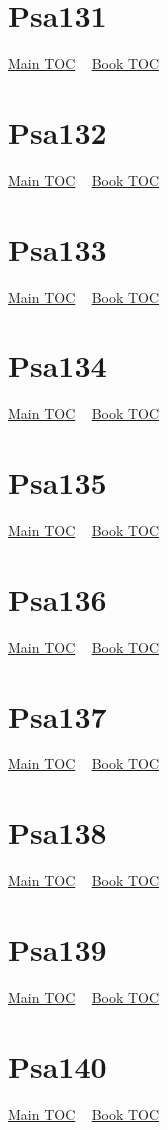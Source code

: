 \documentclass{book}
\begin{document}
  \section{Psa131}\hyperlink{toc}{Main TOC} ~ \hyperref[subsec:Psa]{Book TOC} 
  \section{Psa132}\hyperlink{toc}{Main TOC} ~ \hyperref[subsec:Psa]{Book TOC} 
  \section{Psa133}\hyperlink{toc}{Main TOC} ~ \hyperref[subsec:Psa]{Book TOC} 
  \section{Psa134}\hyperlink{toc}{Main TOC} ~ \hyperref[subsec:Psa]{Book TOC} 
  \section{Psa135}\hyperlink{toc}{Main TOC} ~ \hyperref[subsec:Psa]{Book TOC} 
  \section{Psa136}\hyperlink{toc}{Main TOC} ~ \hyperref[subsec:Psa]{Book TOC} 
  \section{Psa137}\hyperlink{toc}{Main TOC} ~ \hyperref[subsec:Psa]{Book TOC} 
  \section{Psa138}\hyperlink{toc}{Main TOC} ~ \hyperref[subsec:Psa]{Book TOC} 
  \section{Psa139}\hyperlink{toc}{Main TOC} ~ \hyperref[subsec:Psa]{Book TOC} 
  \section{Psa140}\hyperlink{toc}{Main TOC} ~ \hyperref[subsec:Psa]{Book TOC} 
\end{document}
